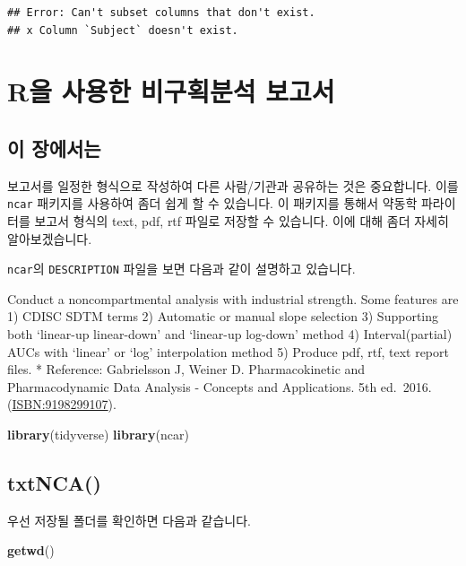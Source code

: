 \documentclass[
  10pt,
]{krantz}
\makeatletter
\newenvironment{Shaded}{\begin{snugshade}}{\end{snugshade}}
\newcommand{\KeywordTok}[1]{\textcolor[rgb]{0.13,0.29,0.53}{\textbf{#1}}}
\newcommand{\NormalTok}[1]{#1}
\renewenvironment{quote}{\begin{VF}}{\end{VF}}
\newenvironment{kframe}{%
\medskip{}
\setlength{\fboxsep}{.8em}
 \def\at@end@of@kframe{}%
 \ifinner\ifhmode%
  \def\at@end@of@kframe{\end{minipage}}%
  \begin{minipage}{\columnwidth}%
 \fi\fi%
 \def\FrameCommand##1{\hskip\@totalleftmargin \hskip-\fboxsep
 \colorbox{shadecolor}{##1}\hskip-\fboxsep
     \hskip-\linewidth \hskip-\@totalleftmargin \hskip\columnwidth}%
 \MakeFramed {\advance\hsize-\width
   \@totalleftmargin\z@ \linewidth\hsize
   \@setminipage}}%
 {\par\unskip\endMakeFramed%
 \at@end@of@kframe}
\renewenvironment{Shaded}{\begin{kframe}}{\end{kframe}}
\makeatother
\begin{document}
\begin{verbatim}
## Error: Can't subset columns that don't exist.
## x Column `Subject` doesn't exist.
\end{verbatim}

\hypertarget{ncar}{%
\chapter{R을 사용한 비구획분석 보고서}\label{ncar}}

\hypertarget{summary-ncar}{%
\section{이 장에서는}\label{summary-ncar}}

보고서를 일정한 형식으로 작성하여 다른 사람/기관과 공유하는 것은 중요합니다. 이를 \texttt{ncar} 패키지를 사용하여 좀더 쉽게 할 수 있습니다.
이 패키지를 통해서 약동학 파라이터를 보고서 형식의 text, pdf, rtf 파일로 저장할 수 있습니다.
이에 대해 좀더 자세히 알아보겠습니다.

\texttt{ncar}의 \texttt{DESCRIPTION} 파일을 보면 다음과 같이 설명하고 있습니다.

\begin{quote}
Conduct a noncompartmental analysis with industrial strength.
Some features are
1) CDISC SDTM terms
2) Automatic or manual slope selection
3) Supporting both `linear-up linear-down' and `linear-up log-down' method
4) Interval(partial) AUCs with `linear' or `log' interpolation method
5) Produce pdf, rtf, text report files.
* Reference: Gabrielsson J, Weiner D. Pharmacokinetic and Pharmacodynamic Data Analysis - Concepts and Applications. 5th ed.~2016. (\url{ISBN:9198299107}).
\end{quote}

\begin{Shaded}
\begin{Highlighting}[]
\KeywordTok{library}\NormalTok{(tidyverse)}
\KeywordTok{library}\NormalTok{(ncar)}
\end{Highlighting}
\end{Shaded}

\hypertarget{txtnca}{%
\section{txtNCA()}\label{txtnca}}

우선 저장될 폴더를 확인하면 다음과 같습니다.

\begin{Shaded}
\begin{Highlighting}[]
\KeywordTok{getwd}\NormalTok{()}
\end{Highlighting}
\end{Shaded}
\end{document}
